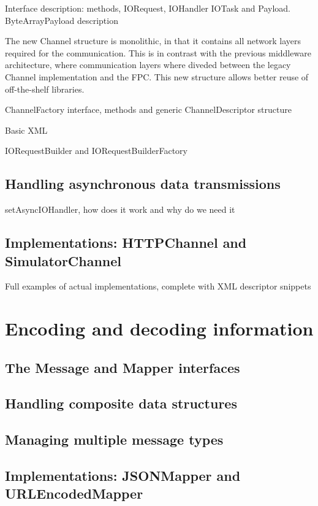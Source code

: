 Interface description: methods, IORequest, IOHandler IOTask and Payload.
ByteArrayPayload description

The new Channel structure is monolithic, in that it contains all network layers required for the communication. This is in contrast with the previous middleware architecture, where communication layers where diveded between the legacy Channel implementation and the FPC. This new structure allows better reuse of off-the-shelf libraries.

ChannelFactory interface, methods and generic ChannelDescriptor structure

Basic XML 

IORequestBuilder and IORequestBuilderFactory

\subsection{Handling asynchronous data transmissions}

setAsyncIOHandler, how does it work and why do we need it

\subsection{Implementations: HTTPChannel and SimulatorChannel}
\label{sec:channel.implementations}

Full examples of actual implementations, complete with XML descriptor snippets


\section{Encoding and decoding information}

\subsection{The Message and Mapper interfaces}

\subsection{Handling composite data structures}

\subsection{Managing multiple message types}

\subsection{Implementations: JSONMapper and URLEncodedMapper}


